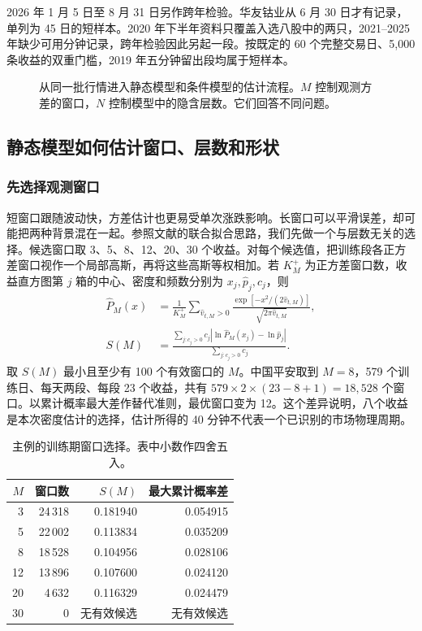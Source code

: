 \documentclass[11pt,a4paper]{article}
\newcommand{\chart}[4]{\begin{figure}[H]\centering\resizebox{#1\linewidth}{!}{}\caption{#3}\label{#4}\end{figure}}
\begin{document}
2026 年 1 月 5 日至 8 月 31 日另作跨年检验。华友钴业从 6 月 30 日才有记录，单列为 45 日的短样本。2020 年下半年资料只覆盖入选八股中的两只，2021--2025 年缺少可用分钟记录，跨年检验因此另起一段。按既定的 60 个完整交易日、5,000 条收益的双重门槛，2019 年五分钟留出段均属于短样本。
\chart{.97}{transfer_architecture}{从同一批行情进入静态模型和条件模型的估计流程。$M$ 控制观测方差的窗口，$N$ 控制模型中的隐含层数。它们回答不同问题。}{fig:architecture}


\clearpage
\subsection{静态模型如何估计窗口、层数和形状}
\subsubsection{先选择观测窗口}
短窗口跟随波动快，方差估计也更易受单次涨跌影响。长窗口可以平滑误差，却可能把两种背景混在一起。参照文献\cite{vasconcelos2024}的联合拟合思路，我们先做一个与层数无关的选择。候选窗口取 3、5、8、12、20、30 个收益。对每个候选值，把训练段各正方差窗口视作一个局部高斯，再将这些高斯等权相加。若 $K_M^+$ 为正方差窗口数，收益直方图第 $j$ 箱的中心、密度和频数分别为 $x_j,\widehat p_j,c_j$，则
\begin{align}
 \widehat P_M(x)&=\frac{1}{K_M^+}\sum_{\widehat v_{t,M}>0}\frac{\exp[-x^2/(2\widehat v_{t,M})]}{\sqrt{2\pi\widehat v_{t,M}}},\\
 S(M)&=\frac{\sum_{j:c_j>0}c_j|\ln\widehat P_M(x_j)-\ln\widehat p_j|}{\sum_{j:c_j>0}c_j}.
\end{align}
取 $S(M)$ 最小且至少有 100 个有效窗口的 $M$。中国平安取到 $M=8$，579 个训练日、每天两段、每段 23 个收益，共有 $579\times2\times(23-8+1)=18,528$ 个窗口。以累计概率最大差作替代准则，最优窗口变为 12。这个差异说明，八个收益是本次密度估计的选择，估计所得的 40 分钟不代表一个已识别的市场物理周期。
\begin{table}[H]
\centering
\small
\caption{主例的训练期窗口选择。表中小数作四舍五入。}
\label{tab:method_windows}
\begin{tabular}{rrrr}
\toprule
$M$ & 窗口数 & $S(M)$ & 最大累计概率差\\
\midrule
3 & 24\,318 & 0.181940 & 0.054915\\
5 & 22\,002 & 0.113834 & 0.035209\\
8 & 18\,528 & 0.104956 & 0.028106\\
12 & 13\,896 & 0.107600 & 0.024120\\
20 & 4\,632 & 0.116329 & 0.024479\\
30 & 0 & 无有效候选 & 无有效候选\\
\bottomrule
\end{tabular}
\end{table}
\end{document}
